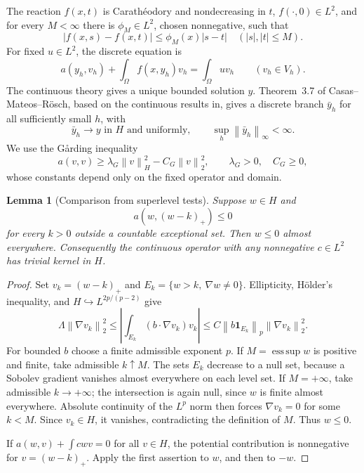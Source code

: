 \documentclass[11pt,a4paper]{article}
\newcommand{\norm}[1]{\left\lVert#1\right\rVert}
\newcommand{\abs}[1]{\left\lvert#1\right\rvert}
\newtheorem{lemma}[theorem]{Lemma}
\theoremstyle{definition}
\theoremstyle{remark}
\numberwithin{equation}{section}
\begin{document}
The reaction $f(x,t)$ is Carath\'eodory and nondecreasing in $t$, $f(\cdot,0)\in L^2$, and for every $M<\infty$ there is $\phi_M\in L^2$, chosen nonnegative, such that
\[
 \abs{f(x,s)-f(x,t)}\le\phi_M(x)\abs{s-t}
 \quad (\abs{s},\abs{t}\le M).
\]
For fixed $u\in L^2$, the discrete equation is
\begin{equation}\label{eq:gal-discrete}
 a(y_h,v_h)+\int_\Omega f(x,y_h)v_h=\int_\Omega u v_h
 \qquad(v_h\in V_h).
\end{equation}
The continuous theory gives a unique bounded solution $y$. Theorem~3.7 of Casas--Mateos--R\"osch\cite{cmr2021}, based on the continuous results in\cite{cmr2020}, gives a discrete branch $\bar y_h$ for all sufficiently small $h$, with
\begin{equation}\label{eq:gal-bounded-branch}
 \bar y_h\longrightarrow y\text{ in }H\text{ and uniformly},
 \qquad \sup_h\norm{\bar y_h}_\infty<\infty.
\end{equation}
We use the G\aa rding inequality
\begin{equation}\label{eq:gal-garding}
 a(v,v)\ge\lambda_G\norm{v}_H^2-C_G\norm{v}_2^2,
 \qquad \lambda_G>0,\quad C_G\ge0,
\end{equation}
whose constants depend only on the fixed operator and domain.

\begin{lemma}[Comparison from superlevel tests]\label{lem:gal-comparison}
Suppose $w\in H$ and
\[
 a(w,(w-k)_+)\le0
\]
for every $k>0$ outside a countable exceptional set. Then $w\le0$ almost everywhere. Consequently the continuous operator with any nonnegative $c\in L^2$ has trivial kernel in $H$.
\end{lemma}
\begin{proof}
Set $v_k=(w-k)_+$ and $E_k=\{w>k,\ \nabla w\ne0\}$. Ellipticity, H\"older's inequality, and $H\hookrightarrow L^{2p/(p-2)}$ give
\[
 \Lambda\norm{\nabla v_k}_2^2
 \le\abs{\int_{E_k}(b\cdot\nabla v_k)v_k}
 \le C\norm{b\mathbf1_{E_k}}_p\norm{\nabla v_k}_2^2.
\]
For bounded $b$ choose a finite admissible exponent $p$. If $M=\operatorname*{ess\,sup}w$ is positive and finite, take admissible $k\uparrow M$. The sets $E_k$ decrease to a null set, because a Sobolev gradient vanishes almost everywhere on each level set. If $M=+\infty$, take admissible $k\to+\infty$; the intersection is again null, since $w$ is finite almost everywhere. Absolute continuity of the $L^p$ norm then forces $\nabla v_k=0$ for some $k<M$. Since $v_k\in H$, it vanishes, contradicting the definition of $M$. Thus $w\le0$.

If $a(w,v)+\int cwv=0$ for all $v\in H$, the potential contribution is nonnegative for $v=(w-k)_+$. Apply the first assertion to $w$, and then to $-w$.
\end{proof}
\end{document}
